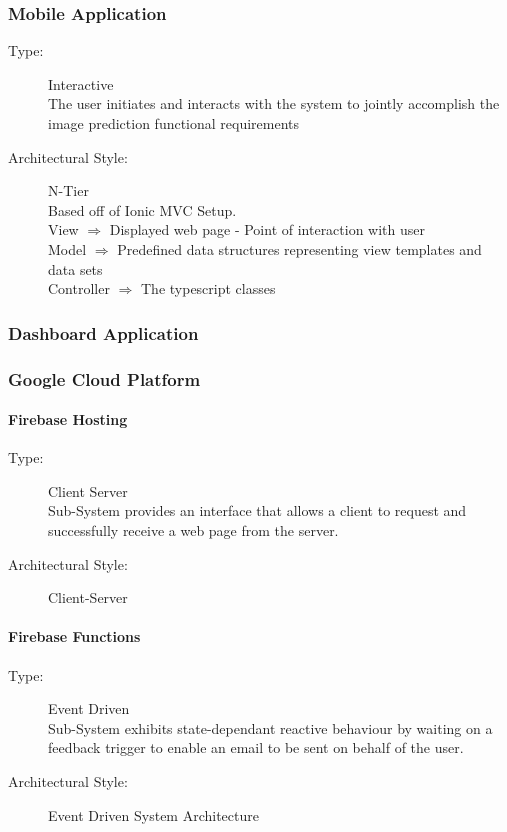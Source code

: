 \documentclass[a4paper, 11pt]{article}
\begin{document}
\subsubsection{Mobile Application}
\begin{description}
  \item[Type:] Interactive \\
  The user initiates and interacts with the system to jointly accomplish the image prediction functional requirements
  \item[Architectural Style:] N-Tier \\
  Based off of Ionic MVC Setup. \\
  View $\Rightarrow$ Displayed web page - Point of interaction with user \\
  Model $\Rightarrow$ Predefined data structures representing view templates and data sets \\
  Controller $\Rightarrow$ The typescript classes
\end{description}

\subsubsection{Dashboard Application}


\subsubsection{Google Cloud Platform}

\paragraph{Firebase Hosting}
\begin{description}
  \item[Type:] Client Server \\
  Sub-System provides an interface that allows a client to request and successfully receive a web page from the server.
  \item[Architectural Style:] Client-Server
\end{description}

\paragraph{Firebase Functions}
\begin{description}
  \item[Type:] Event Driven \\
    Sub-System exhibits state-dependant reactive behaviour by waiting on a feedback trigger to enable an email to be sent on behalf of the user.
  \item[Architectural Style:] Event Driven System Architecture
\end{description}
\end{document}
